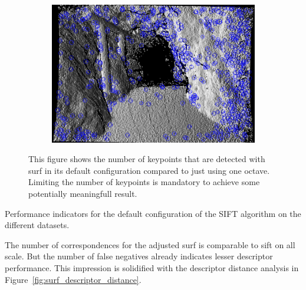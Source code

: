 \begin{figure}[H]
\begin{subfigure}[t]{0.25\linewidth}
\end{subfigure}%
\begin{subfigure}[t]{0.25\linewidth}
    \includegraphics[width=\linewidth]{chapter06/results/SURF/bearing/oneoctave_kp0005.png}%
\end{subfigure}%
\caption[\acrshort{surf} keypoint plotted]{This figure shows the number of keypoints that are detected with \acrshort{surf} in its default configuration compared to just using one octave. Limiting the number of keypoints is mandatory to achieve some potentially meaningfull result.}\label{fig:surf_keypoints_mess}
\end{figure}
\begin{table}[H]
    {\renewcommand{\arraystretch}{1.2}%
    \setlength{\tabcolsep}{0.3em}%

    }
    \caption{Performance indicators for the default configuration of the SIFT algorithm on the different datasets.}\label{tab:surf_results}
\end{table}
The number of correspondences for the adjusted \acrshort{surf} is comparable to \acrshort{sift} on all scale.
But the number of false negatives already indicates lesser descriptor performance.
This impression is solidified with the descriptor distance analysis in Figure~\ref{fig:surf_descriptor_distance}.
